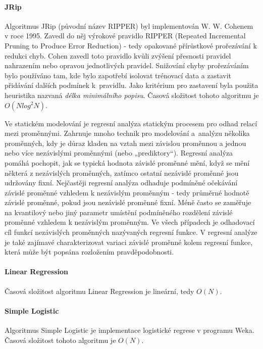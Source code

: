 \documentclass[12pt]{article}
\begin{document}
\paragraph{JRip}
Algoritmus JRip (původní název RIPPER) byl implementován W. W. Cohenem v roce 1995. Zavedl do něj výrokové pravidlo RIPPER (Repeated Incremental Pruning to Produce Error Reduction) - tedy opakované přírůstkové prořezávání k redukci chyb. Cohen zavedl toto pravidlo kvůli zvýšení přesnosti pravidel nahrazením nebo opravou jednotlivých pravidel. Snižování chyby prořezáváním bylo používáno tam, kde bylo zapotřebí isolovat trénovací data a zastavit přidávání dalších podmínek k~pravidlu. Jako kritérium pro zastavení byla použita heuristika nazvaná \textit{délka minimálního popisu}. 
\newline
\indent 
Časová složitost tohoto algoritmu je $O(N log^2 N)$. \citep{ethem}

Ve statickém modelování je regresní analýza statickým procesem pro odhad relací mezi proměnnými. Zahrnuje mnoho technik pro modelování a~analýzu několika proměnných, kdy je důraz kladen na vztah mezi závislou proměnnou a jednou nebo více nezávislými proměnnými (nebo „prediktory“). Regresní analýza pomáhá pochopit, jak se typická hodnota závislé proměnné mění, když se mění některá z nezávislých proměnných, zatímco ostatní nezávislé proměnné jsou udržovány fixní. Nejčastěji regresní analýza odhaduje podmíněné očekávání závislé proměnné vzhledem k nezávislým proměnným - tedy průměrné hodnotě závislé proměnné, pokud jsou nezávislé proměnné fixní. Méně často se zaměřuje na kvantilový nebo jiný parametr umístění podmíněného rozdělení závislé proměnné vzhledem k nezávislým proměnným. Ve všech případech je odhadovací cíl funkcí nezávislých proměnných nazývaných regresní funkce. V regresní analýze je také zajímavé charakterizovat variaci závislé proměnné kolem regresní funkce, která může být popsána rozložením pravděpodobnosti. \citep{freedman}
\paragraph{Linear Regression}
Časová složitost algoritmu Linear Regression je lineární, tedy $O(N)$. \citep{jordan}
\paragraph{Simple Logistic}
Algoritmus Simple Logistic je implementace logistické regrese v programu Weka. Časová složitost tohoto algoritmu je $O(N)$. \citep{jordan}
\end{document}
